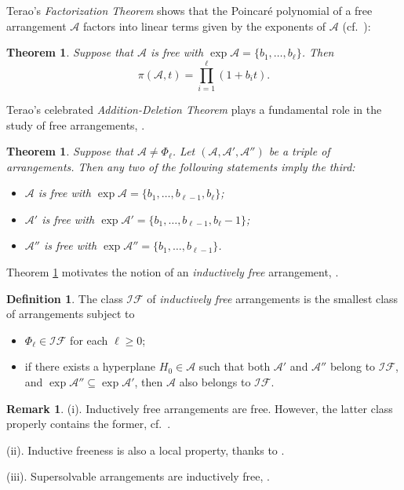 \documentclass[12pt]{amsart}
\newcommand\CA{{\mathscr A}}
\newcommand\CIF{{\mathcal {IF}}}
\numberwithin{equation}{section}
\theoremstyle{plain}
\newtheorem{theorem}[equation]{Theorem}
\theoremstyle{definition}
\newtheorem{defn}[equation]{Definition}
\newtheorem{remark}[equation]{Remark}
\begin{document}
Terao's \emph{Factorization Theorem}
\cite{terao:freefactors} shows
that the Poincar\'e polynomial
of a free arrangement $\CA$
factors into linear terms
given by the exponents of $\CA$
(cf.\ \cite[Thm.\ 4.137]{orlikterao:arrangements}):

\begin{theorem}
	\label{thm:freefactors}
	Suppose that
	$\CA$ is free with $\exp \CA = \{ b_1, \ldots , b_\ell\}$.
	Then
	\[
	\pi(\CA,t) = \prod_{i=1}^\ell (1 + b_i t).
	\]
\end{theorem}

Terao's celebrated \emph{Addition-Deletion Theorem}
\cite{terao:freeI} plays a
fundamental role in the study of free arrangements,
\cite[Thm.\ 4.51]{orlikterao:arrangements}.

\begin{theorem}
	\label{thm:add-del}
	Suppose that $\CA \ne \Phi_\ell$.
	Let  $(\CA, \CA', \CA'')$ be a triple of arrangements. Then any
	two of the following statements imply the third:
	\begin{itemize}
		\item[(i)] $\CA$ is free with $\exp \CA = \{ b_1, \ldots , b_{\ell -1}, b_\ell\}$;
		\item[(ii)] $\CA'$ is free with $\exp \CA' = \{ b_1, \ldots , b_{\ell -1}, b_\ell-1\}$;
		\item[(iii)] $\CA''$ is free with $\exp \CA'' = \{ b_1, \ldots , b_{\ell -1}\}$.
	\end{itemize}
\end{theorem}

Theorem \ref{thm:add-del} motivates the notion of an
\emph{inductively free} arrangement,
\cite[Def.\ 4.53]{orlikterao:arrangements}.

\begin{defn}
	\label{def:indfree}
	The class $\CIF$ of \emph{inductively free} arrangements
	is the smallest class of arrangements subject to
	\begin{itemize}
		\item[(i)] $\Phi_\ell \in \CIF$ for each $\ell \ge 0$;
		\item[(ii)] if there exists a hyperplane $H_0 \in \CA$ such that both
		$\CA'$ and $\CA''$ belong to $\CIF$, and $\exp \CA '' \subseteq \exp \CA'$,
		then $\CA$ also belongs to $\CIF$.
	\end{itemize}
\end{defn}

\begin{remark}
	\label{rem:indfree}
	(i). 
	Inductively free arrangements are free. However, the latter class properly contains the former, cf.~\cite[Ex.~4.59]{orlikterao:arrangements}.
	
	(ii). Inductive freeness is also a local property, thanks to  \cite[Thm~1.1]{hogeroehrleschauenburg:free}.
	
	(iii). Supersolvable arrangements
	are inductively free, 
	\cite[Thm.\ 4.58]{orlikterao:arrangements}.
\end{remark}
\end{document}
